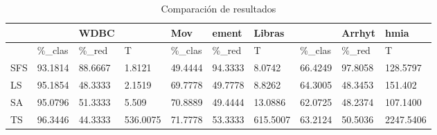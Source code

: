 \begin{table}[H]
	\centering
	\begin{tabular}{l|lll|lll|lll}
			& 			& WDBC 		&			&	  Mov	& ement 	& Libras	&			& Arrhyt	& hmia		\\ \hline
			& \%\_clas	& \%\_red	& T			& \%\_clas	& \%\_red	& T			& \%\_clas	& \%\_red	& T			\\ \hline
		SFS	& 93.1814	& 88.6667 	& 1.8121	& 49.4444	& 94.3333	& 8.0742	& 66.4249	& 97.8058	& 128.5797 	\\ \hline
		LS	& 95.1854	& 48.3333	& 2.1519	& 69.7778	& 49.7778	& 8.8262	& 64.3005	& 48.3453	& 151.402  	\\ \hline
		SA	& 95.0796	& 51.3333	& 5.509		& 70.8889	& 49.4444	& 13.0886	& 62.0725	& 48.2374	& 107.1400	\\ \hline
		TS	& 96.3446	& 44.3333	& 536.0075	& 71.7778	& 53.3333	& 615.5007	& 63.2124	& 50.5036	& 2247.5406
		
	\end{tabular}
	\caption{Comparación de resultados}
	\label{Compare}
\end{table}